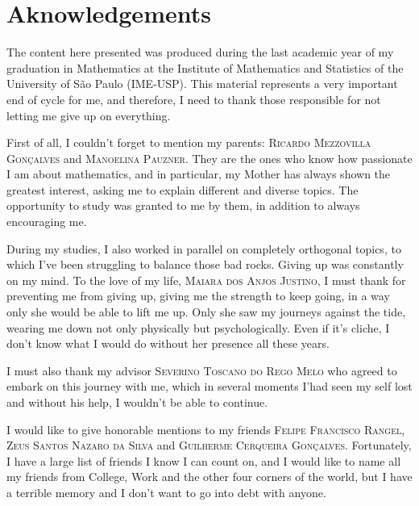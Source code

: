 \chapter*{Aknowledgements}

The content here presented was produced during the last academic year of my graduation in Mathematics at the Institute of Mathematics and Statistics of the University of São Paulo (IME-USP). This material represents a very important end of cycle for me, and therefore, I need to thank those responsible for not letting me give up on everything.

First of all, I couldn't forget to mention my parents: \textsc{Ricardo Mezzovilla Gonçalves} and \textsc{Manoelina Pauzner}. They are the ones who know how passionate I am about mathematics, and in particular, my Mother has always shown the greatest interest, asking me to explain different and diverse topics. The opportunity to study was granted to me by them, in addition to always encouraging me.

During my studies, I also worked in parallel on completely orthogonal topics, to which I've been struggling to balance those bad rocks. Giving up was constantly on my mind. To the love of my life, \textsc{Maiara dos Anjos Justino}, I must thank for preventing me from giving up, giving me the strength to keep going, in a way only she would be able to lift me up. Only she saw my journeys against the tide, wearing me down not only physically but psychologically. Even if it's cliche, I don't know what I would do without her presence all these years.

I must also thank my advisor \textsc{Severino Toscano do Rego Melo} who agreed to embark on this journey with me, which in several moments I'had seen my self lost and without his help, I wouldn't be able to continue.

I would like to give honorable mentions to my friends \textsc{Felipe Francisco Rangel}, \textsc{Zeus Santos Nazaro da Silva} and \textsc{Guilherme Cerqueira Gonçalves}. Fortunately, I have a large list of friends I know I can count on, and I would like to name all my friends from College, Work and the other four corners of the world, but I have a terrible memory and I don't want to go into debt with anyone.